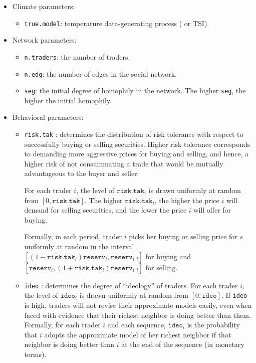 \documentclass{wscpaperproc}\usepackage[]{graphicx}\usepackage[]{color}
\begin{document}
\begin{itemize}
  \item Climate parameters:
  \begin{itemize}
    \item  \texttt{true.model}: temperature data-generating process ( or TSI).
  \end{itemize}
  \item Network parameters:
  \begin{itemize}
    \item  \texttt{n.traders}: the number of traders.
    \item  \texttt{n.edg}: the number of edges in the social network.
    \item  \texttt{seg}: the initial degree of homophily in the network. 
    The higher  \texttt{seg}, the higher the initial homophily. 
  \end{itemize}
    
  \item Behavioral parameters:
  \begin{itemize}
    \item  \texttt{risk.tak} : determines the distribution of risk tolerance with respect to successfully buying or selling securities.     Higher risk tolerance corresponds to demanding more aggressive prices for buying and selling, and hence, a higher risk of not consummating a trade that would be mutually advantageous to the buyer and seller.
    
    For each trader $i$, the level of $\texttt{risk.tak}_i$ is drawn uniformly at random from $[0,\texttt{risk.tak}]$.
    The higher $\texttt{risk.tak}_i$, the higher the price $i$ will demand for selling securities, and the lower the price $i$ will offer for buying.
    
    Formally, in each period, trader $i$ picks her buying or selling price for $s$ uniformly at random in the interval  
    $[(1 - \texttt{risk.tak}_i) \texttt{reserv}_{i}, \allowbreak  \texttt{reserv}_{i,t}]$ for buying and 
    $[\texttt{reserv}_{i}, \allowbreak (1  + \texttt{risk.tak}_i) \texttt{reserv}_{i,t}]$ for selling. 
  \item  \texttt{ideo} :  determines the degree of ``ideology'' of traders.
    For each trader $i$, the level of $\texttt{ideo}_i$ is drawn uniformly at random from $[0,\texttt{ideo}]$.
    If \texttt{ideo} is high, traders will not revise their approximate models easily, even when faced with evidence that their richest neighbor is doing better than them. 
    Formally, for each trader $i$ and each sequence, $\texttt{ideo}_i$ is the probability that $i$ adopts the approximate model of her richest neighbor if that neighbor is doing better than $i$ at the end of the sequence (in monetary terms).
  \end{itemize}
\end{itemize}
\end{document}
